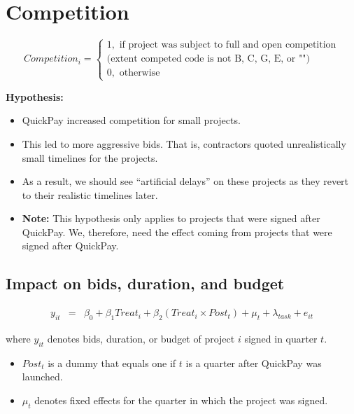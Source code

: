 \documentclass[
]{article}
\providecommand{\tightlist}{%
  \setlength{\itemsep}{0pt}\setlength{\parskip}{0pt}}
\begin{document}
\hypertarget{competition}{%
\section{Competition}\label{competition}}

\[ Competition_i = \begin{cases} 1, \text{ if project was subject to full and open competition}\\ 
                       \text{(extent competed code is not B, C, G, E, or "")}\\
0, \text{ otherwise} \end{cases}\]

\textbf{Hypothesis:}

\begin{itemize}
\tightlist
\item
  QuickPay increased competition for small projects.
\item
  This led to more aggressive bids. That is, contractors quoted
  unrealistically small timelines for the projects.
\item
  As a result, we should see ``artificial delays'' on these projects as
  they revert to their realistic timelines later.
\item
  \textbf{Note:} This hypothesis only applies to projects that were
  signed after QuickPay. We, therefore, need the effect coming from
  projects that were signed after QuickPay.
\end{itemize}

\hypertarget{impact-on-bids-duration-and-budget}{%
\subsection{Impact on bids, duration, and
budget}\label{impact-on-bids-duration-and-budget}}

\[ \begin{aligned}
y_{it} &=& \beta_0 + \beta_1 Treat_i + \beta_2 (Treat_i \times Post_t) +\mu_t+ \lambda_{task}+ e_{it}
\end{aligned}\]

where \(y_{it}\) denotes bids, duration, or budget of project \(i\)
signed in quarter \(t\).

\begin{itemize}
\tightlist
\item
  \(Post_t\) is a dummy that equals one if \(t\) is a quarter after
  QuickPay was launched.
\item
  \(\mu_t\) denotes fixed effects for the quarter in which the project
  was signed.
\end{itemize}
\end{document}
